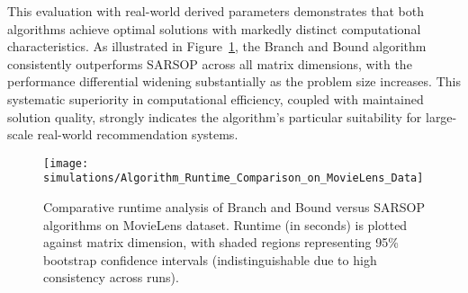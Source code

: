 This evaluation with real-world derived parameters demonstrates that both algorithms achieve optimal solutions with markedly distinct computational characteristics. As illustrated in Figure~\ref{fig:movielens}, the Branch and Bound algorithm consistently outperforms SARSOP across all matrix dimensions, with the performance differential widening substantially as the problem size increases. This systematic superiority in computational efficiency, coupled with maintained solution quality, strongly indicates the algorithm's particular suitability for large-scale real-world recommendation systems. 

\begin{figure}
    \centering
    \texttt{[image: simulations/Algorithm\_Runtime\_Comparison\_on\_MovieLens\_Data]}
    \caption{Comparative runtime analysis of Branch and Bound versus SARSOP algorithms on MovieLens dataset. Runtime (in seconds) is plotted against matrix dimension, with shaded regions representing 95\% bootstrap confidence intervals (indistinguishable due to high consistency across runs).}
    \label{fig:movielens}
\end{figure}